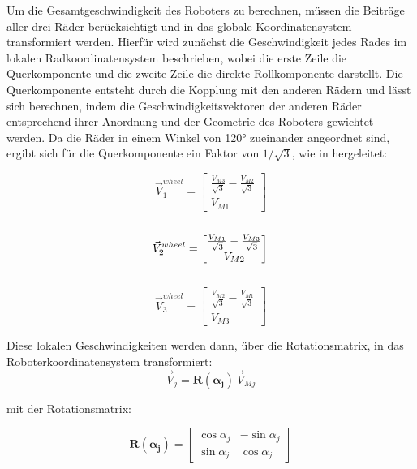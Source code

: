 Um die Gesamtgeschwindigkeit des Roboters zu berechnen, müssen die Beiträge aller drei Räder berücksichtigt und in das globale Koordinatensystem transformiert werden. Hierfür wird zunächst die Geschwindigkeit jedes Rades im lokalen Radkoordinatensystem beschrieben, wobei die erste Zeile die Querkomponente und die zweite Zeile die direkte Rollkomponente darstellt. Die Querkomponente entsteht durch die Kopplung mit den anderen Rädern und lässt sich berechnen, indem die Geschwindigkeitsvektoren der anderen Räder entsprechend ihrer Anordnung und der Geometrie des Roboters gewichtet werden. Da die Räder in einem Winkel von 120° zueinander angeordnet sind, ergibt sich für die Querkomponente ein Faktor von $1/\sqrt{3}$, wie in \cite{Hacene2019} hergeleitet:

\begin{equation}
    \vec{V}_1^{wheel} = 
    \begin{bmatrix}
    \frac{V_{M3}}{\sqrt{3}} - \frac{V_{M2}}{\sqrt{3}} \\
    V_{M1}
    \end{bmatrix}
\end{equation}
\\
\begin{equation}
    \vec{V}_2^{wheel} = 
    \begin{bmatrix}
    \frac{V_{M1}}{\sqrt{3}} - \frac{V_{M3}}{\sqrt{3}}\\
    V_{M2}
    \end{bmatrix} \\
\end{equation}
\\
\begin{equation}
    \vec{V}_3^{wheel} = 
    \begin{bmatrix}
    \frac{V_{M2}}{\sqrt{3}} - \frac{V_{M1}}{\sqrt{3}}\\
    V_{M3}
    \end{bmatrix}
\end{equation}

Diese lokalen Geschwindigkeiten werden dann, über die Rotationsmatrix, in das Roboterkoordinatensystem transformiert:\\

\begin{equation}
\vec{V}_j = \mathbf{R(\alpha_j)}\,\vec{V}_{Mj}
\end{equation}

mit der Rotationsmatrix:

\begin{equation}
\mathbf{R(\alpha_j)} =
    \begin{bmatrix}
    \cos\alpha_j & -\sin\alpha_j \\
    \sin\alpha_j & \cos\alpha_j
    \end{bmatrix}
\end{equation}

